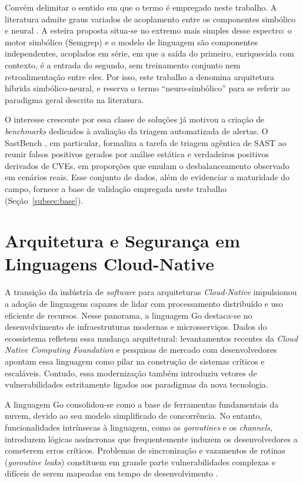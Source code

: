 Convém delimitar o sentido em que o termo é empregado neste trabalho. A literatura admite graus variados de acoplamento entre os componentes simbólico e neural \cite{garcez2020neurosymbolic}. A esteira proposta situa-se no extremo mais simples desse espectro: o motor simbólico (Semgrep) e o modelo de linguagem são componentes independentes, acoplados em série, em que a saída do primeiro, enriquecida com contexto, é a entrada do segundo, sem treinamento conjunto nem retroalimentação entre eles. Por isso, este trabalho a denomina arquitetura híbrida simbólico-neural, e reserva o termo ``neuro-simbólico'' para se referir ao paradigma geral descrito na literatura.

O interesse crescente por essa classe de soluções já motivou a criação de \textit{benchmarks} dedicados à avaliação da triagem automatizada de alertas. O SastBench \cite{feiglin2026sastbench}, em particular, formaliza a tarefa de triagem agêntica de SAST ao reunir falsos positivos gerados por análise estática e verdadeiros positivos derivados de CVEs, em proporções que emulam o desbalanceamento observado em cenários reais. Esse conjunto de dados, além de evidenciar a maturidade do campo, fornece a base de validação empregada neste trabalho (Seção~\ref{subsec:base}).

\section{Arquitetura e Segurança em Linguagens Cloud-Native}
A transição da indústria de \textit{software} para arquiteturas \textit{Cloud-Native} impulsionou a adoção de linguagens capazes de lidar com processamento distribuído e uso eficiente de recursos. Nesse panorama, a linguagem Go destaca-se no desenvolvimento de infraestruturas modernas e microsserviços. Dados do ecossistema refletem essa mudança arquitetural: levantamentos recentes da \textit{Cloud Native Computing Foundation} \cite{cncf2025survey} e pesquisas de mercado com desenvolvedores \cite{stackoverflow2025} apontam essa linguagem como pilar na construção de sistemas críticos e escaláveis. Contudo, essa modernização também introduziu vetores de vulnerabilidades estritamente ligados aos paradigmas da nova tecnologia.

A linguagem Go consolidou-se como a base de ferramentas fundamentais da nuvem, devido ao seu modelo simplificado de concorrência. No entanto, funcionalidades intrínsecas à linguagem, como as \textit{goroutines} e os \textit{channels}, introduzem lógicas assíncronas que frequentemente induzem os desenvolvedores a cometerem erros críticos. Problemas de sincronização e vazamentos de rotinas (\textit{goroutine leaks}) constituem em grande parte vulnerabilidades complexas e difíceis de serem mapeadas em tempo de desenvolvimento \cite{tu2019understanding}.

